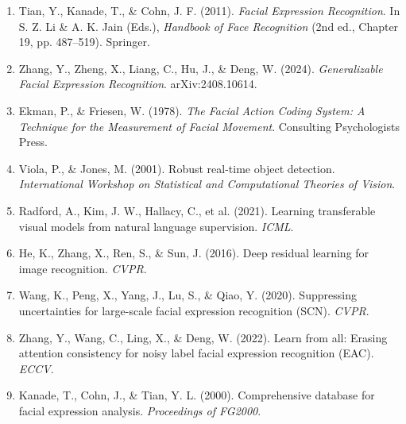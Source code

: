 \documentclass[12pt,a4paper]{article}
\begin{document}
\begin{enumerate}
    \item Tian, Y., Kanade, T., \& Cohn, J. F. (2011). \textit{Facial Expression Recognition}. In S. Z. Li \& A. K. Jain (Eds.), \textit{Handbook of Face Recognition} (2nd ed., Chapter 19, pp. 487--519). Springer.

    \item Zhang, Y., Zheng, X., Liang, C., Hu, J., \& Deng, W. (2024). \textit{Generalizable Facial Expression Recognition}. arXiv:2408.10614.

    \item Ekman, P., \& Friesen, W. (1978). \textit{The Facial Action Coding System: A Technique for the Measurement of Facial Movement}. Consulting Psychologists Press.

    \item Viola, P., \& Jones, M. (2001). Robust real-time object detection. \textit{International Workshop on Statistical and Computational Theories of Vision}.

    \item Radford, A., Kim, J. W., Hallacy, C., et al. (2021). Learning transferable visual models from natural language supervision. \textit{ICML}.

    \item He, K., Zhang, X., Ren, S., \& Sun, J. (2016). Deep residual learning for image recognition. \textit{CVPR}.

    \item Wang, K., Peng, X., Yang, J., Lu, S., \& Qiao, Y. (2020). Suppressing uncertainties for large-scale facial expression recognition (SCN). \textit{CVPR}.

    \item Zhang, Y., Wang, C., Ling, X., \& Deng, W. (2022). Learn from all: Erasing attention consistency for noisy label facial expression recognition (EAC). \textit{ECCV}.

    \item Kanade, T., Cohn, J., \& Tian, Y. L. (2000). Comprehensive database for facial expression analysis. \textit{Proceedings of FG2000}.
    \label{kanade2000}
\end{enumerate}
\end{document}
